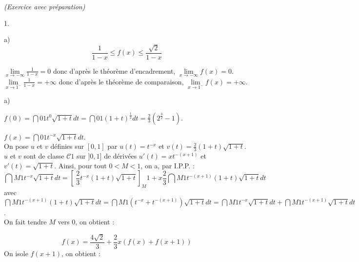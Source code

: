 \documentclass[11pt]{article}%
\begin{document}
\begin{exercice}{\it (Exercice avec préparation)}
\begin{noliste}{1.}
\begin{noliste}{a)}
\[
 \frac{1}{1-x} \leq f(x) \leq\frac{\sqrt{2}}{1-x} 
\]
 \item $\lim \limits_{x \to -\infty} \frac{1}{1-x} = 0$ donc d'après le
théorème d'encadrement, $\lim \limits_{x \to -\infty } f(x) = 0$.\\
 $\lim \limits_{x \to 1^-} \frac{1}{1-x} = + \infty$ donc d'après le
théorème de comparaison, $\lim \limits_{x \to 1^-} f(x) = + \infty$.
 \end{noliste}
 \item \begin{noliste}{a)}
 \setlength{\itemsep}{2mm}
 \item $f(0) = \dint{0}{1} t^{0} \sqrt{1 + t}dt = \dint{0}{1} (1 +
t)^{\frac{1}{2}}dt = \frac{2}{3} (2^\frac{3}{2}-1)$.
 \item $f(x) = \dint{0}{1} t^{-x} \sqrt{1 + t}dt$. \\
 On pose $u$ et $v$ définies sur $[0,1]$ par $u(t) = t^{-x}$ et $v(t) =
\frac{2}{3}(1 + t)\sqrt{1 + t}$. $u$ et $v$ sont de classe
$\mathcal{C}{1}$ sur $]0,1]$ de dérivées $u'(t) = x t^{-(x + 1)}$ et
$v'(t) = \sqrt{1 + t}$. Ainsi, pour tout $0 < M < 1$, on a, par I.P.P.
: \\
 
\[
 \dint{M}{1} t^{-x} \sqrt{1 + t}dt = [ \ \frac{2}{3}t^{-x}(1 +
t)\sqrt{1 + t}]_{M}{1} + x\frac{2}{3} \dint{M}{1} t^{-(x + 1)}(1 +
t)\sqrt{1 + t}dt 
\]
 avec $\dint{M}{1}t^{-(x + 1)}(1 + t)\sqrt{1 + t}dt = \dint{M}{1}
(t^{-x} + t^{-(x + 1)})\sqrt{1 + t}dt = \dint{M}{1} t^{-x}\sqrt{1 +
t}dt + \dint{M}{1} t^{-(x + 1)}\sqrt{1 + t}dt $.\\
 On fait tendre $M$ vers $0$, on obtient : 
 
\[
 f(x) = \frac{4 \sqrt{2}}{3} + \frac{2}{3}x(f(x) + f(x + 1))
\]
 On isole $f(x + 1)$, on obtient : 
 

\end{noliste}
\end{noliste}
\end{exercice}
\end{document}
